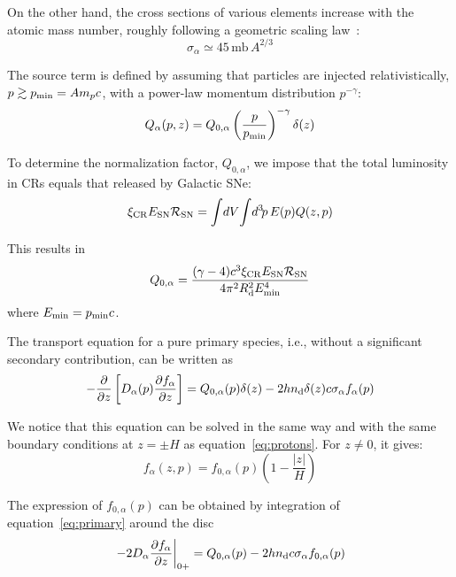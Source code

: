 On the other hand, the cross sections of various elements increase with the atomic mass number, roughly following a geometric scaling law~\cite{Letaw1983apjs}:
%
\begin{equation}
\sigma_\alpha \simeq 45 \, \text{mb} \, A^{2/3}
\end{equation}

The source term is defined by assuming that particles are injected relativistically, $p \gtrsim p_{\rm min} = A m_p c$, with a power-law momentum distribution $p^{-\gamma}$:
%
\begin{equation}
Q_\alpha(p, z) = Q_{0,\alpha} \left(\frac{p}{p_{\rm min}}\right)^{-\gamma} \delta (z) 
\end{equation}

To determine the normalization factor, $Q_{0,\alpha}$, we impose that the total luminosity in CRs equals that released by Galactic SNe:
%
\begin{equation}
\xi_{\rm CR} E_{\rm SN} \mathcal R_{\rm SN} = \int \! dV \! \int \! d^3 \! p \, E(p) Q(z,p)
\end{equation}

This results in
%
\begin{equation}
Q_{0,\alpha} = \frac{(\gamma - 4) c^3 \xi_{\rm CR} E_{\rm SN} \mathcal R_{\rm SN}}{4 \pi^2 R_{\rm d}^2 E_{\rm min}^4}
\end{equation}
%
where $E_{\rm min} = p_{\rm min} c$.

The transport equation for a pure primary species, i.e., without a significant secondary contribution, can be written as
%
\begin{equation}
-\frac{\partial}{\partial z} \left[ D_\alpha(p) \frac{\partial f_\alpha}{\partial z} \right] = Q_{0,\alpha}(p)\delta(z) - 2 h n_{\rm d} \delta (z) c \sigma_\alpha f_\alpha(p)
\label{eq:primary}
\end{equation}

We notice that this equation can be solved in the same way and with the same boundary conditions at $z = \pm H$ as equation~\eqref{eq:protons}. For $z \neq 0$, it gives:
%
\begin{equation}
f_\alpha(z,p) = f_{0,\alpha}(p) \left( 1 - \frac{|z|}{H} \right)
\end{equation}

The expression of $f_{0,\alpha}(p)$ can be obtained by integration of equation~\eqref{eq:primary} around the disc
%
\begin{equation}
\left. -2 D_\alpha \frac{\partial f_\alpha}{\partial z} \right|_{0+} = Q_{0,\alpha}(p) - 2 h n_{\rm d} c \sigma_{\alpha} f_{0,\alpha}(p)
\end{equation}

